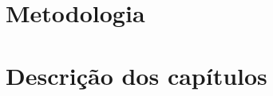 \section{Metodologia}
\label{sec:methodology}

\section{Descrição dos capítulos}
\label{sec:description}
%
%
%
%
%
%
%
